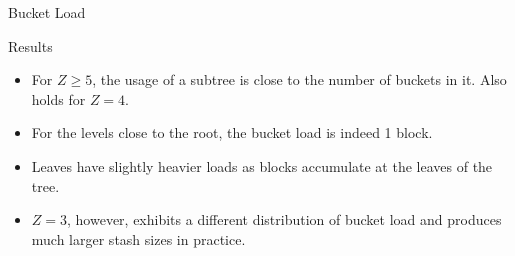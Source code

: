 	\begin{frame}{Bucket Load}
		
		\begin{block}{Results}
			
			\begin{itemize}
				\item 
					For $Z \ge 5$, the usage of a subtree is close to the number of buckets in it.
					Also holds for $Z = 4$.
				\item 
					For the levels close to the root, the bucket load is indeed 1 block.
				\item 
					Leaves have slightly heavier loads as blocks accumulate at the leaves of the tree.
				\item
					$Z = 3$, however, exhibits a different distribution of bucket load and produces much larger stash sizes in practice.
			\end{itemize}
			
		\end{block}
			
		
	\end{frame}
